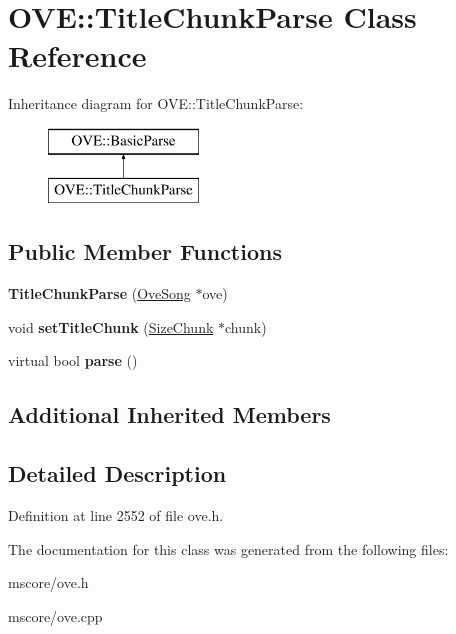 \hypertarget{class_o_v_e_1_1_title_chunk_parse}{}\section{O\+VE\+:\+:Title\+Chunk\+Parse Class Reference}
\label{class_o_v_e_1_1_title_chunk_parse}
Inheritance diagram for O\+VE\+:\+:Title\+Chunk\+Parse\+:\begin{figure}[H]
\begin{center}
\leavevmode
\includegraphics[height=2.000000cm]{class_o_v_e_1_1_title_chunk_parse}
\end{center}
\end{figure}
\subsection*{Public Member Functions}
\begin{DoxyCompactItemize}
\item 
\mbox{\label{class_o_v_e_1_1_title_chunk_parse_ae5ddfbcd1018076e7f2acaa0b4c5753e}} 
{\bfseries Title\+Chunk\+Parse} (\hyperlink{class_o_v_e_1_1_ove_song}{Ove\+Song} $\ast$ove)
\item 
\mbox{\label{class_o_v_e_1_1_title_chunk_parse_a6bd0de1d3361cb9b3fd1566527221c06}} 
void {\bfseries set\+Title\+Chunk} (\hyperlink{class_o_v_e_1_1_size_chunk}{Size\+Chunk} $\ast$chunk)
\item 
\mbox{\label{class_o_v_e_1_1_title_chunk_parse_a776fa850eb7d2c487d91df0189c56cea}} 
virtual bool {\bfseries parse} ()
\end{DoxyCompactItemize}
\subsection*{Additional Inherited Members}


\subsection{Detailed Description}


Definition at line 2552 of file ove.\+h.



The documentation for this class was generated from the following files\+:\begin{DoxyCompactItemize}
\item 
mscore/ove.\+h\item 
mscore/ove.\+cpp\end{DoxyCompactItemize}
